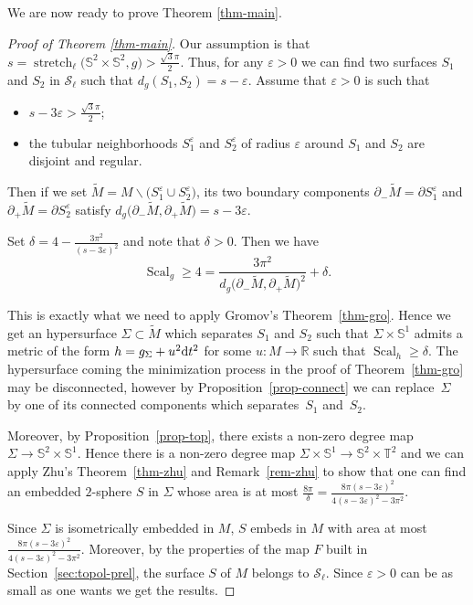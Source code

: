 \documentclass[pdftex]{sigma}
\numberwithin{equation}{section}
\DeclareMathOperator{\scal}{Scal}
\DeclareMathOperator{\str}{stretch}
\newcommand{\eps}{\varepsilon}
\begin{document}
We are now ready to prove Theorem \ref{thm-main}.
\begin{proof}[Proof of Theorem \ref{thm-main}]
 Our assumption is that $s=\str_{\ell}\big(\mathbb{S}^2\times \mathbb{S}^2,g\big) >
 \tfrac{\sqrt{3}\pi}{2}$. Thus, for any $\eps>0$ we can find two surfaces
 $S_1$ and $S_2$ in $\mathcal{S}_\ell$ such that $d_g(S_1,S_2)=
 s-\eps$. Assume that $\eps>0$ is such that
 \begin{itemize}\itemsep=0pt
 \item $s-3\eps>\frac{\sqrt{3}\pi}{2}$;
 \item the tubular neighborhoods $S_1^\eps$ and $S_2^\eps$ of radius
 $\eps$ around $S_1$ and $S_2$ are disjoint and regular.
 \end{itemize}
 Then if we set $\tilde M=M\backslash \big(S_1^\eps\cup S_2^\eps\big)$, its
 two boundary components $\partial_-\tilde M=\partial S_1^\eps$ and
 $\partial_+\tilde M=\partial S_2^\eps$ satisfy $d_g\big(\partial_-\tilde
 M, \partial_+\tilde M\big)= s-3\eps$.

 Set $\delta=4-\frac{3\pi^2}{(s-3\eps)^2}$ and note that $\delta>0$. Then we have
 \[\scal_g\geq 4=\frac{3\pi^2}{d_g\big(\partial_-\tilde
 M, \partial_+\tilde M\big)^2}+\delta.\]

 This is exactly what we need to apply Gromov's Theorem~\ref{thm-gro}. Hence we get an hypersurface $\Sigma\subset\tilde M$
 which separates $S_1$ and $S_2$ such that
 $\Sigma\times\mathbb{S}^1$ admits a metric of the form
 $h=g_\Sigma+u^2{\rm d}t^2$ for some $u\colon M\to\mathbb{R}$ such that
 $\scal_h\geq\delta$. The hypersurface coming the minimization
 process in the proof of Theorem~\ref{thm-gro} may be disconnected,
 however by Proposition~\ref{prop-connect} we can replace~$\Sigma$ by
 one of its connected components which separates~$S_1$ and~$S_2$.

 Moreover, by Proposition~\ref{prop-top}, there exists a non-zero
 degree map $\Sigma\to\mathbb{S}^2\times\mathbb{S}^1$. Hence there is
 a non-zero degree map
 $\Sigma\times\mathbb{S}^1\to\mathbb{S}^2\times\mathbb{T}^2$ and we
 can apply Zhu's Theorem~\ref{thm-zhu} and Remark~\ref{rem-zhu} to
 show that one can find an embedded $2$-sphere $S$ in $\Sigma$ whose
 area is at most $\frac{8\pi}{\delta}=\frac{8\pi
 (s-3\eps)^2}{4(s-3\eps)^2-3\pi^2}$.

 Since $\Sigma$ is isometrically embedded in
 $M$, $S$ embeds in $M$ with area at most $\frac{8\pi
 (s-3\eps)^2}{4(s-3\eps)^2-3\pi^2}$. Moreover, by the properties of the map $F$
 built in Section~\ref{sec:topol-prel}, the surface $S$ of $M$
 belongs to $\mathcal{S}_\ell$. Since $\eps>0$ can be as small as one
 wants we get the results.
\end{proof}
\end{document}
